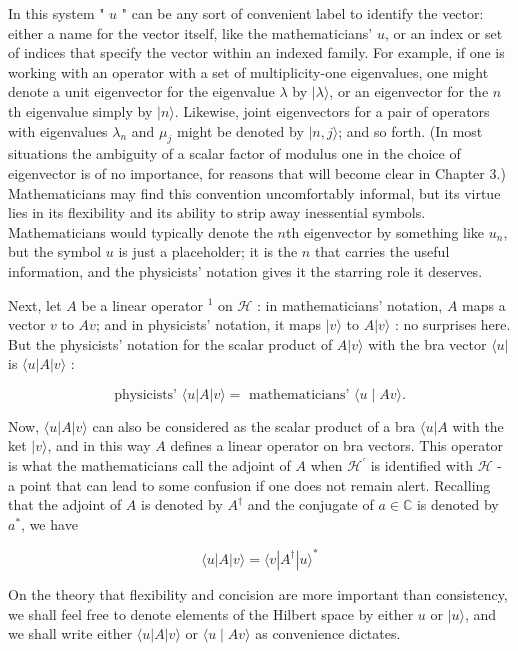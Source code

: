 \documentclass[10pt, letterpaper]{article}
\begin{document}
In this system " $u$ " can be any sort of convenient label to identify the vector: either a name for the vector itself, like the mathematicians' $u$, or an index or set of indices that specify the vector within an indexed family. For example, if one is working with an operator with a set of multiplicity-one eigenvalues, one might denote a unit eigenvector for the eigenvalue $\lambda$ by $|\lambda\rangle$, or an eigenvector for the $n$th eigenvalue simply by $|n\rangle$. Likewise, joint eigenvectors for a pair of operators with eigenvalues $\lambda_{n}$ and $\mu_{j}$ might be denoted by $|n, j\rangle$; and so forth. (In most situations the ambiguity of a scalar factor of modulus one in the choice of eigenvector is of no importance, for reasons that will become clear in Chapter 3.) Mathematicians may find this convention uncomfortably informal, but its virtue lies in its flexibility and its ability to strip away inessential symbols. Mathematicians would typically denote the $n$th eigenvector by something like $u_{n}$, but the symbol $u$ is just a placeholder; it is the $n$ that carries the useful information, and the physicists' notation gives it the starring role it deserves.

Next, let $A$ be a linear operator ${ }^{1}$ on $\mathcal{H}$ : in mathematicians' notation, $A$ maps a vector $v$ to $A v$; and in physicists' notation, it maps $|v\rangle$ to $A|v\rangle$ : no surprises here. But the physicists' notation for the scalar product of $A|v\rangle$ with the bra vector $\langle u|$ is $\langle u| A|v\rangle$ :

$$
\text { physicists' }\langle u| A|v\rangle=\text { mathematicians' }\langle u \mid A v\rangle \text {. }
$$

Now, $\langle u| A|v\rangle$ can also be considered as the scalar product of a bra $\langle u| A$ with the ket $|v\rangle$, and in this way $A$ defines a linear operator on bra vectors. This operator is what the mathematicians call the adjoint of $A$ when $\mathcal{H}^{\prime}$ is identified with $\mathcal{H}$ - a point that can lead to some confusion if one does not remain alert. Recalling that the adjoint of $A$ is denoted by $A^{\dagger}$ and the conjugate of $a \in \mathbb{C}$ is denoted by $a^{*}$, we have

$$
\langle u| A|v\rangle=\langle v| A^{\dagger}|u\rangle^{*}
$$

On the theory that flexibility and concision are more important than consistency, we shall feel free to denote elements of the Hilbert space by either $u$ or $|u\rangle$, and we shall write either $\langle u| A|v\rangle$ or $\langle u \mid A v\rangle$ as convenience dictates.
\end{document}
